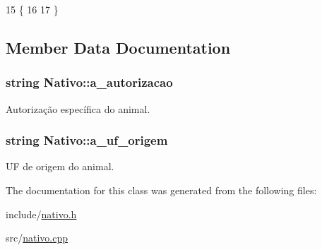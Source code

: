 \begin{DoxyCode}
15 \{
16 
17 \}
\end{DoxyCode}


\subsection{Member Data Documentation}
\subsubsection[{\texorpdfstring{a\+\_\+autorizacao}{a_autorizacao}}]{\setlength{\rightskip}{0pt plus 5cm}string Nativo\+::a\+\_\+autorizacao\hspace{0.3cm}{\ttfamily [protected]}}\hypertarget{classNativo_a1dc025166815eb0f250ce58330e4fbcb}{}\label{classNativo_a1dc025166815eb0f250ce58330e4fbcb}


Autorização específica do animal. 

\subsubsection[{\texorpdfstring{a\+\_\+uf\+\_\+origem}{a_uf_origem}}]{\setlength{\rightskip}{0pt plus 5cm}string Nativo\+::a\+\_\+uf\+\_\+origem\hspace{0.3cm}{\ttfamily [protected]}}\hypertarget{classNativo_a260f26d7ad44221c1dca0ec01183482a}{}\label{classNativo_a260f26d7ad44221c1dca0ec01183482a}


UF de origem do animal. 



The documentation for this class was generated from the following files\+:\begin{DoxyCompactItemize}
\item 
include/\hyperlink{nativo_8h}{nativo.\+h}\item 
src/\hyperlink{nativo_8cpp}{nativo.\+cpp}\end{DoxyCompactItemize}
